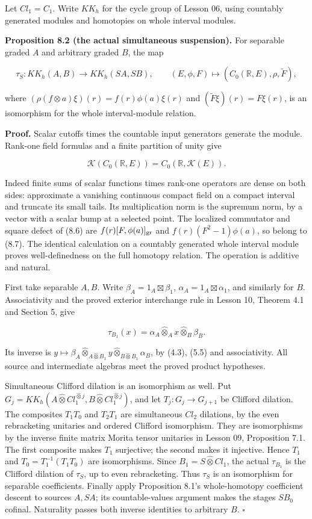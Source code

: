 \documentclass[
  11pt,
]{article}
\begin{document}
Let \(Cl_1=C_1\). Write \(KK_h\) for the cycle group of Lesson 06, using
countably generated modules and homotopies on whole interval modules.

\textbf{Proposition 8.2 (the actual simultaneous suspension).} For
separable graded \(A\) and arbitrary graded \(B\), the map

\[
 \tau_S:KK_h(A,B)\longrightarrow KK_h(SA,SB),\qquad
 (E,\phi,F)\longmapsto(C_0(\mathbb R,E),\rho,\widetilde F),
 \tag{8.6}
\]

where \((\rho(f\otimes a)\xi)(r)=f(r)\phi(a)\xi(r)\) and
\((\widetilde F\xi)(r)=F\xi(r)\), is an isomorphism for the whole
interval-module relation.

\textbf{Proof.} Scalar cutoffs times the countable input generators
generate the module. Rank-one field formulas and a finite partition of
unity give

\[
 \mathcal K(C_0(\mathbb R,E))=C_0(\mathbb R,\mathcal K(E)).
 \tag{8.7}
\]

Indeed finite sums of scalar functions times rank-one operators are
dense on both sides: approximate a vanishing continuous compact field on
a compact interval and truncate its small tails. Its multiplication norm
is the supremum norm, by a vector with a scalar bump at a selected
point. The localized commutator and square defect of (8.6) are
\(f(r)[F,\phi(a)]_{\rm gr}\) and \(f(r)(F^2-1)\phi(a)\), so belong to
(8.7). The identical calculation on a countably generated whole interval
module proves well-definedness on the full homotopy relation. The
operation is additive and natural.

First take separable \(A,B\). Write \(\beta_A=1_A\boxtimes\beta_1\),
\(\alpha_A=1_A\boxtimes\alpha_1\), and similarly for \(B\).
Associativity and the proved exterior interchange rule in Lesson 10,
Theorem 4.1 and Section 5, give

\[
 \tau_{B_1}(x)=\alpha_A\widehat\otimes_A x\widehat\otimes_B\beta_B.
 \tag{8.8}
\]

Its inverse is
\(y\mapsto\beta_A\widehat\otimes_{A\widehat\otimes B_1}y\widehat\otimes_{B\widehat\otimes B_1}\alpha_B\),
by (4.3), (5.5) and associativity. All source and intermediate algebras
meet the proved product hypotheses.

Simultaneous Clifford dilation is an isomorphism as well. Put
\(G_j=KK_h(A\widehat\otimes Cl_1^{\widehat\otimes j},B\widehat\otimes Cl_1^{\widehat\otimes j})\),
and let \(T_j:G_j\to G_{j+1}\) be Clifford dilation. The composites
\(T_1T_0\) and \(T_2T_1\) are simultaneous \(Cl_2\) dilations, by the
even rebracketing unitaries and ordered Clifford isomorphism. They are
isomorphisms by the inverse finite matrix Morita tensor unitaries in
Lesson 09, Proposition 7.1. The first composite makes \(T_1\)
surjective; the second makes it injective. Hence \(T_1\) and
\(T_0=T_1^{-1}(T_1T_0)\) are isomorphisms. Since
\(B_1=S\widehat\otimes Cl_1\), the actual \(\tau_{B_1}\) is the Clifford
dilation of \(\tau_S\), up to even rebracketing. Thus \(\tau_S\) is an
isomorphism for separable coefficients. Finally apply Proposition 8.1's
whole-homotopy coefficient descent to sources \(A,SA\); its
countable-values argument makes the stages \(SB_0\) cofinal. Naturality
passes both inverse identities to arbitrary \(B\). \(\square\)
\end{document}
